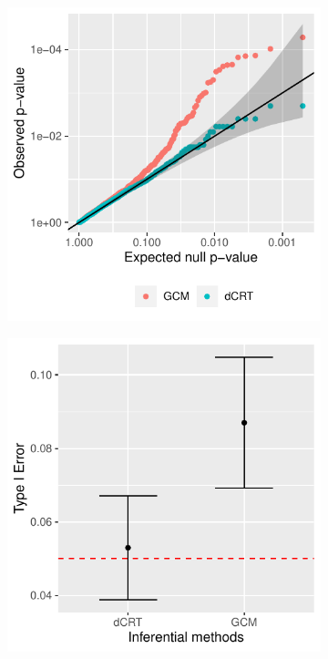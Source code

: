 \documentclass{article}
\begin{document}
\begin{figure}
    \begin{subfigure}{0.5\textwidth}
        \centering
        \includegraphics[width=\linewidth]{Figures/Q1/qq-plots.pdf} \\
    \end{subfigure}%
    \begin{subfigure}{0.5\textwidth}
        \centering
        \includegraphics[width=\linewidth]{Figures/Q1/type_I_err_5e-2.pdf} \\ 
    \end{subfigure}


\end{figure}
\end{document}
